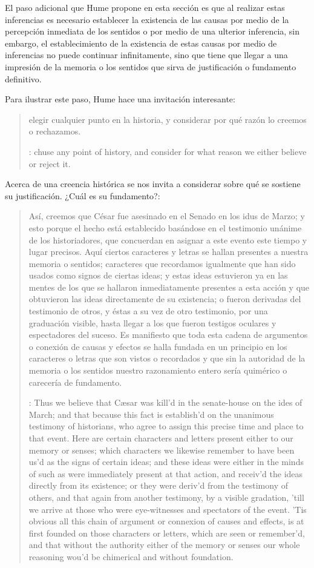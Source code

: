 El paso adicional que Hume propone en esta sección es que al realizar estas
inferencias es necesario establecer la existencia de las causas por medio de la
percepción inmediata de los sentidos o por medio de una ulterior inferencia, sin
embargo, el establecimiento de la existencia de estas causas por medio de
inferencias no puede continuar infinitamente, sino que tiene que llegar a una
impresión de la memoria o los sentidos que sirva de justificación o fundamento
definitivo.

Para ilustrar este paso, Hume hace una invitación interesante:
  \blockquote[{\cite[?]{humetreatise}}: chuse any point of history, and consider
  for what reason we either believe or reject it.]{elegir cualquier punto en la
    historia, y considerar por qué razón lo creemos o rechazamos.} Acerca de una
  creencia histórica se nos invita a considerar sobre qué se sostiene su
  justificación. ¿Cuál es su fundamento?:
  \blockquote[{\cite[?]{humetratise}}: Thus we believe that Cæsar was kill’d in
  the senate-house on the ides of March; and that because this fact is establish’d
  on the unanimous testimony of historians, who agree to assign this precise time
  and place to that event. Here are certain characters and letters present either
  to our memory or senses; which characters we likewise remember to have been us’d
  as the signs of certain ideas; and these ideas were either in the minds of such
  as were immediately present at that action, and receiv’d the ideas directly from
  its existence; or they were deriv’d from the testimony of others, and that again
  from another testimony, by a visible gradation, ’till we arrive at those who
  were eye-witnesses and spectators of the event. ’Tis obvious all this chain of
  argument or connexion of causes and effects, is at first founded on those
  characters or letters, which are seen or remember’d, and that without the
  authority either of the memory or senses our whole reasoning wou’d be chimerical
  and without foundation.]{Así, creemos que César fue asesinado en el Senado en
    los idus de Marzo; y esto porque el hecho está establecido basándose en el
    testimonio unánime de los historiadores, que concuerdan en asignar a este
    evento este tiempo y lugar precisos. Aquí ciertos caracteres y letras se
    hallan presentes a nuestra memoria o sentidos; caracteres que recordamos
    igualmente que han sido usados como signos de ciertas ideas; y estas ideas
    estuvieron ya en las mentes de los que se hallaron inmediatamente presentes a
    esta acción y que obtuvieron las ideas directamente de su existencia; o fueron
    derivadas del testimonio de otros, y éstas a su vez de otro testimonio, por
    una graduación visible, hasta llegar a los que fueron testigos oculares y
    espectadores del suceso. Es manifiesto que toda esta cadena de argumentos o
    conexión de causas y efectos se halla fundada en un principio en los
    caracteres o letras que son vistos o recordados y que sin la autoridad de la
    memoria o los sentidos nuestro razonamiento entero sería quimérico o carecería
    de fundamento.}

